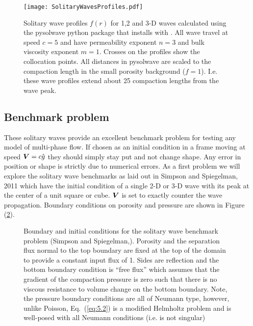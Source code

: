 \begin{figure}[htbp!]
  \centering
  \texttt{[image: SolitaryWavesProfiles.pdf]}
  \caption{Solitary wave profiles $f(r)$ for 1,2 and 3-D waves
    calculated using the pysolwave python package that installs with
    \TF.  All wave travel at speed $c=5$ and have permeability
    exponent $n=3$ and bulk viscosity exponent $m=1$.  Crosses on the
    profiles show the collocation points. All distances in pysolwave
    are scaled to the compaction length in the small porosity
    background ($f=1$).  I.e. these wave profiles extend about 25
    compaction lengths from the wave peak.}
\label{fig:SolitaryWaveProfiles}
 \end{figure}

\subsection{Benchmark problem}
\label{sec:benchmark-problem}

These solitary waves provide an excellent benchmark problem for
testing any model of multi-phase flow.  If chosen as an initial
condition in a frame moving at speed ${\mbox{\boldmath$V$}} = c\hat{g}$ they should
simply stay put and not change shape.  Any error in position or shape
is strictly due to numerical errors.  As a first problem we will
explore the solitary wave benchmarks as laid out in Simpson and
Spiegelman, 2011 \cite{simpson_solitary_2011} which have the initial
condition of  a single 2-D
or 3-D wave with its peak at the center of a unit square or cube.
${\mbox{\boldmath$V$}}$ is set to exactly counter the wave propagation.  Boundary
conditions on porosity and pressure are shown in Figure (\ref{fig:solitarywavebcs}). 

\begin{figure}[htbp!]
  \centering
  \def\svgwidth{.8\textwidth}
  
  \caption{Boundary and initial conditions for the solitary wave
    benchmark problem (Simpson and
    Spiegelman,\cite{simpson_solitary_2011}). Porosity and the
    separation flux normal to the top boundary are fixed at the top of
    the domain to provide  a constant input flux of 1.
  Sides are reflection and the bottom boundary condition is ``free
  flux'' which assumes that the gradient of the compaction pressure is
zero such that there is no viscous resistance to volume change on the
bottom boundary. Note, the pressure boundary conditions are all of
Neumann type,  however, unlike Poisson,  Eq.\ (\ref{eq:5.2}) is a
modified Helmholtz problem and is well-posed with all Neumann
conditions (i.e. is not singular)}
  \label{fig:solitarywavebcs}
\end{figure}


